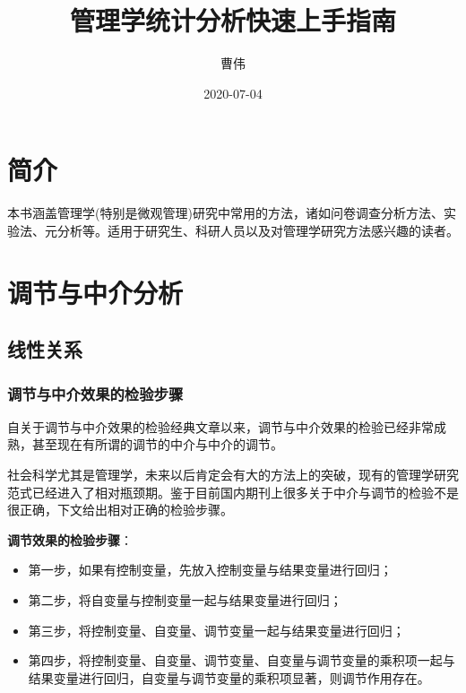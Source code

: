 \documentclass[
]{book}
\title{管理学统计分析快速上手指南}
\author{曹伟}
\date{2020-07-04}
\providecommand{\tightlist}{%
  \setlength{\itemsep}{0pt}\setlength{\parskip}{0pt}}
\begin{document}
\maketitle

{
\setcounter{tocdepth}{1}
\tableofcontents
}
\hypertarget{ux7b80ux4ecb}{%
\chapter*{简介}\label{ux7b80ux4ecb}}

本书涵盖管理学(特别是微观管理)研究中常用的方法，诸如问卷调查分析方法、实验法、元分析等。适用于研究生、科研人员以及对管理学研究方法感兴趣的读者。

\hypertarget{mome}{%
\chapter{调节与中介分析}\label{mome}}

\hypertarget{linear}{%
\section{线性关系}\label{linear}}

\hypertarget{momesteps}{%
\subsection{调节与中介效果的检验步骤}\label{momesteps}}

自\autocite{Baron1986:RNG}关于调节与中介效果的检验经典文章以来，调节与中介效果的检验已经非常成熟，甚至现在有所谓的调节的中介与中介的调节。

社会科学尤其是管理学，未来以后肯定会有大的方法上的突破，现有的管理学研究范式已经进入了相对瓶颈期。鉴于目前国内期刊上很多关于中介与调节的检验不是很正确，下文给出相对正确的检验步骤。

\textbf{调节效果的检验步骤}：

\begin{itemize}
\tightlist
\item
  第一步，如果有控制变量，先放入控制变量与结果变量进行回归；
\item
  第二步，将自变量与控制变量一起与结果变量进行回归；
\item
  第三步，将控制变量、自变量、调节变量一起与结果变量进行回归；
\item
  第四步，将控制变量、自变量、调节变量、自变量与调节变量的乘积项一起与结果变量进行回归，自变量与调节变量的乘积项显著，则调节作用存在。
\end{itemize}
\end{document}
